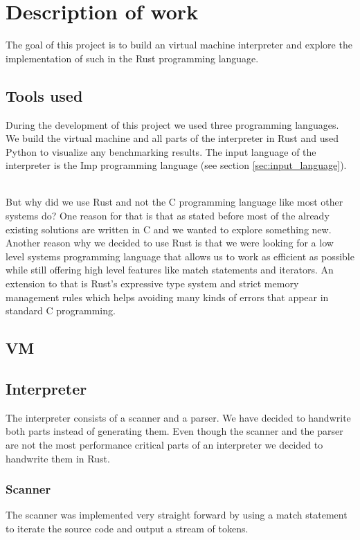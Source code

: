 \documentclass{article}
\begin{document}
\section{Description of work}
The goal of this project is to build an virtual machine interpreter and 
explore the implementation of such in the Rust programming language.

\subsection{Tools used}
During the development of this project we used three programming languages. We
build the virtual machine and all parts of the interpreter in Rust and used
Python to visualize any benchmarking results. The input language of the
interpreter is the Imp programming language (see section
\ref{sec:input_language}). ~\cite{Pierce:SF1}

But why did we use Rust and not the C programming language like most other
systems do?
One reason for that is that as stated before most of the already existing
solutions are written in C and we wanted to explore something new.
Another reason why we decided to use Rust is that we were looking for a low level
systems programming language that allows us to work as efficient as possible
while still offering high level features like match statements and iterators.
An extension to that is Rust's expressive type system and strict memory
management rules which helps avoiding many kinds of errors that appear in 
standard C programming.

\subsection{VM} %


\subsection{Interpreter} %
The interpreter consists of a scanner and a parser. We have decided to
handwrite both parts instead of generating them. Even though the scanner and
the parser are not the most performance critical parts of an interpreter we
decided to handwrite them in Rust.

\subsubsection{Scanner}
The scanner was implemented very straight forward by using a match statement 
to iterate the source code and output a stream of tokens.
\end{document}
